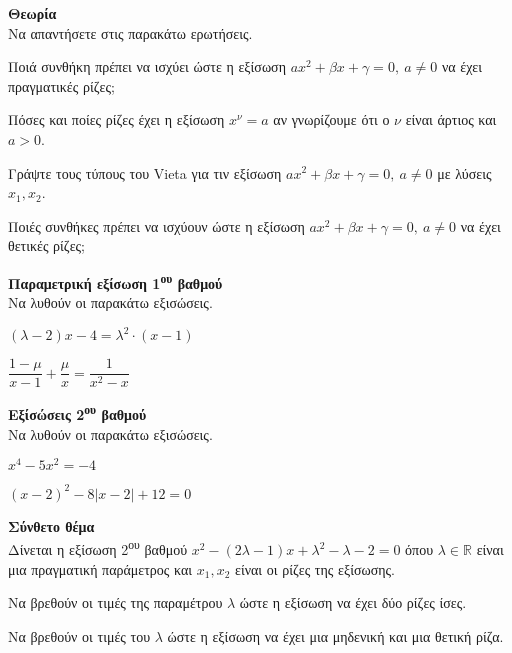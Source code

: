 \documentclass[ektypwsh]{diag-xelatex}
\newcommand{\tss}[1]{\textsuperscript{#1}}
\begin{document}
\askhseis
\begin{thema}
\item \textbf{Θεωρία}\\
Να απαντήσετε στις παρακάτω ερωτήσεις.
\begin{rlist}
\item Ποιά συνθήκη πρέπει να ισχύει ώστε η εξίσωση $ ax^2+\beta x+\gamma=0,\ a\neq 0 $ να έχει πραγματικές ρίζες;
\item Πόσες και ποίες ρίζες έχει η εξίσωση $ x^\nu=a $ αν γνωρίζουμε ότι ο $ \nu $ είναι άρτιος και $ a>0 $.
\item Γράψτε τους τύπους του Vieta για τιν εξίσωση $ ax^2+\beta x+\gamma=0,\ a\neq 0 $ με λύσεις $ x_1,x_2 $.
\item Ποιές συνθήκες πρέπει να ισχύουν ώστε η εξίσωση $ ax^2+\beta x+\gamma=0,\ a\neq 0 $ να έχει θετικές ρίζες;
\end{rlist}
\item \textbf{Παραμετρική εξίσωση 1\tss{ου} βαθμού}\\
Να λυθούν οι παρακάτω εξισώσεις.
\begin{multicols}{2}
\begin{rlist}
\item $ (\lambda -2)x-4=\lambda^2\cdot(x-1) $
\item $ \dfrac{1-\mu}{x-1}+\dfrac{\mu}{x}=\dfrac{1}{x^2-x} $
\end{rlist}
\end{multicols}
\item \textbf{Εξίσώσεις 2\tss{ου} βαθμού}\\
Να λυθούν οι παρακάτω εξισώσεις.
\begin{multicols}{2}
\begin{rlist}
\item $ x^4-5x^2=-4 $
\item $ (x-2)^2-8|x-2|+12=0 $
\end{rlist}
\end{multicols}
\item \textbf{Σύνθετο θέμα}\\
Δίνεται η εξίσωση 2\tss{ου} βαθμού $ x^2-(2\lambda-1)x+\lambda^2-\lambda-2=0 $ όπου $ \lambda\in\mathbb{R} $ είναι μια πραγματική παράμετρος και $ x_1,x_2 $ είναι οι ρίζες της εξίσωσης.
\begin{rlist}
\item Να βρεθούν οι τιμές της παραμέτρου $ \lambda $ ώστε η εξίσωση να έχει δύο ρίζες ίσες.
\item Να βρεθούν οι τιμές του $ \lambda $ ώστε η εξίσωση να έχει μια μηδενική και μια θετική ρίζα.
\end{rlist}
\end{thema}
\end{document}
